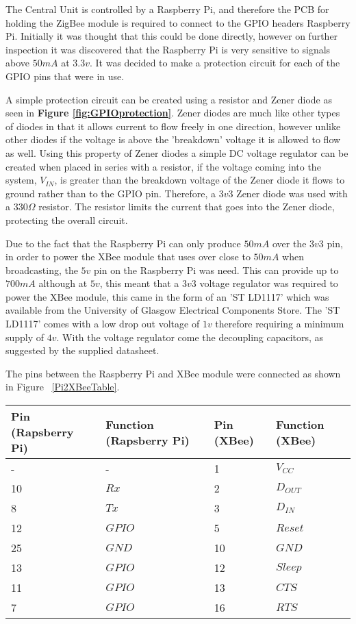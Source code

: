 

The Central Unit is controlled by a Raspberry Pi, and therefore the PCB for holding the ZigBee module is required to connect to the GPIO headers Raspberry Pi.  Initially it was thought that this could be done directly, however on further inspection it was discovered that the Raspberry Pi is very sensitive to signals above \(50mA\) at \(3.3v\). It was decided to make a protection circuit for each of the GPIO pins that were in use. 

A simple protection circuit can be created using a resistor and Zener diode as seen in \textbf{Figure \ref{fig:GPIOprotection}}.  Zener diodes are much like other types of diodes in that it allows current to flow freely in one direction, however unlike other diodes if the voltage is above the 'breakdown' voltage it is allowed to flow as well. Using this property of Zener diodes a simple DC voltage regulator can be created when placed in series with a resistor, if the voltage coming into the system, \(V_{IN}\), is greater than the breakdown voltage of the Zener diode it flows to ground rather than to the GPIO pin. Therefore, a \(3v3\) Zener diode was used with a \(330\Omega\) resistor. The resistor limits the current that goes into the Zener diode, protecting the overall circuit.

Due to the fact that the Raspberry Pi can only produce $50mA$ over the $3v3$ pin, in order to power the XBee module that uses over close to $50mA$ when broadcasting, the $5v$ pin on the Raspberry Pi was need. This can provide up to $700mA$ although at $5v$, this meant that a $3v3$ voltage regulator was required to power the XBee module, this came in the form of an 'ST LD1117' which was available from the University of Glasgow Electrical Components Store. The 'ST LD1117' comes with a low drop out voltage of $1v$ therefore requiring a minimum supply of $4v$. With the voltage regulator come the decoupling capacitors, as suggested by the supplied datasheet.

The pins between the Raspberry Pi and XBee module were connected as shown in Figure ~\ref{Pi2XBeeTable}.

\label{Pi2XBeeTable}
\begin{center}
  \begin{tabular}{| l | l | l | l |}
    \hline
    \bf{Pin (Rapsberry Pi)} & \bf{Function (Rapsberry Pi)} & \bf{Pin (XBee)} & \bf{Function (XBee)} \\ \hline
     - & - & 1 & \(V_{CC}\) \\ \hline
	10 & \(Rx\) & 2 & \(D_{OUT}\) \\ \hline
	8 & \(Tx\) & 3 & \(D_{IN}\) \\ \hline
	12 & \(GPIO\) & 5 & \(Reset\) \\ \hline
	25 & \(GND\) & 10 & \(GND\) \\ \hline
	13 & \(GPIO\) & 12 & \(Sleep\) \\ \hline
	11 & \(GPIO\) & 13 & \(CTS\) \\ \hline
	7 & \(GPIO\) & 16 & \(RTS\) \\
    \hline
  \end{tabular}
\end{center}

